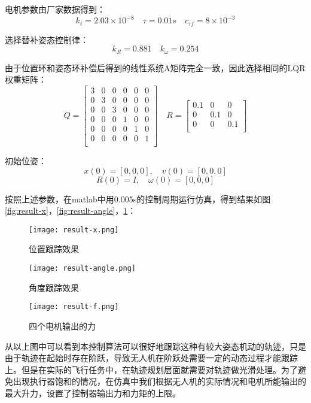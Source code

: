   电机参数由厂家数据得到：
  $$k_t=2.03\times 10^{-8} \quad 
  \tau=0.01s \quad
  c_{\tau f}=8\times 10^{-3}$$

  选择替补姿态控制律：
  $$k_R=0.881 \quad k_\omega=0.254$$

  由于位置环和姿态环补偿后得到的线性系统A矩阵完全一致，因此选择相同的LQR权重矩阵：
  $$Q=\begin{bmatrix}
    3&0&0&0&0&0\\
    0&3&0&0&0&0\\
    0&0&3&0&0&0\\
    0&0&0&1&0&0\\
    0&0&0&0&1&0\\
    0&0&0&0&0&1\\
  \end{bmatrix} \quad R=\begin{bmatrix}
    0.1 &0 &0\\
    0 &0.1 &0\\
    0 &0 &0.1\\
  \end{bmatrix}$$

  初始位姿：
  $$x(0)=[0,0,0],\quad v(0)=[0,0,0]$$
  $$R(0)=I , \quad \omega(0)=[0,0,0]$$

  按照上述参数，在matlab中用0.005s的控制周期运行仿真，得到结果如图\ref{fig:result-x}，\ref{fig:result-angle}，\ref{fig:result-f}：
  \begin{figure}[h]
    \centering
    \begin{minipage}[c]{0.33\textwidth}
      \centering
      \texttt{[image: result-x.png]}
      \caption{位置跟踪效果}
      \label{fig:result-x}
    \end{minipage} \hfill
    \begin{minipage}[c]{0.33\textwidth}
      \centering
      \texttt{[image: result-angle.png]}
      \caption{角度跟踪效果}
      \label{fig:result-angle}
    \end{minipage}\hfill
      \begin{minipage}[c]{0.33\textwidth}
        \centering
        \texttt{[image: result-f.png]}
        \caption{四个电机输出的力}
        \label{fig:result-f}
    \end{minipage}
    \end{figure}

  从以上图中可以看到本控制算法可以很好地跟踪这种有较大姿态机动的轨迹，只是由于轨迹在起始时存在阶跃，导致无人机在阶跃处需要一定的动态过程才能跟踪上。但是在实际的飞行任务中，在轨迹规划层面就需要对轨迹做光滑处理。为了避免出现执行器饱和的情况，在仿真中我们根据无人机的实际情况和电机所能输出的最大升力，设置了控制器输出力和力矩的上限。

